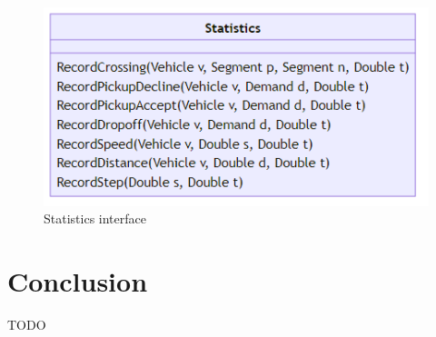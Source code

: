 \documentclass{IEEEtran}
\begin{document}
    \begin{figure}[htbp]
        \centering
        \includegraphics[scale=0.5]{../../diagrams/statistics/classes.png}
        \caption{Statistics interface}
        \label{fig:statistics}
    \end{figure}

    \section{Conclusion}
    \label{sec:con}
    TODO

    
    
\end{document}
